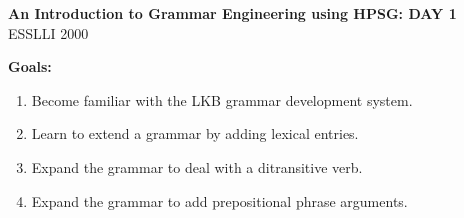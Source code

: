\documentclass[10pt]{article}
\begin{document}
\begin{center}
\textbf{An Introduction to Grammar Engineering using HPSG: DAY 1}\\
ESSLLI 2000
\end{center}

\medskip
\textbf{Goals:}
\begin{enumerate}
\item Become familiar with the LKB grammar development system.
\item Learn to extend a grammar by adding lexical entries.
\item Expand the grammar to deal with a ditransitive verb.
\item Expand the grammar to add prepositional phrase arguments.
\end{enumerate}
\end{document}

